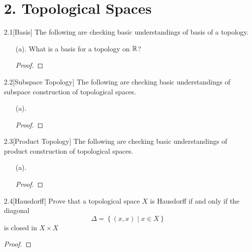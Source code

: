\section*{2. Topological Spaces}

\begin{cusques}{2.1}[Basis] The following are checking basic understandings of basis of a topology.
\begin{enumerate}
    \item[(a).] What is a basis for a topology on $\mathbb{R}$?
    \begin{proof}
    \end{proof}
\end{enumerate}
\end{cusques}

\begin{cusques}{2.2}[Subspace Topology] The following are checking basic understandings of subspace construction of topological spaces.
\begin{enumerate}
    \item[(a).] 
    \begin{proof}
    \end{proof}
\end{enumerate}
\end{cusques}

\begin{cusques}{2.3}[Product Topology] The following are checking basic understandings of product construction of topological spaces.
\begin{enumerate}
    \item[(a).] 
    \begin{proof}
    \end{proof}
\end{enumerate}
\end{cusques}

{}

\begin{cusques}{2.4}[Hausdorff] Prove that a topological space $X$ is Hausdorff if and only if the diagonal 
$$\Delta = \left\{\left(x, x\right) \mid x \in X\right\}$$
is closed in $X \times X$
    \begin{proof}
    \end{proof}
\end{cusques}

